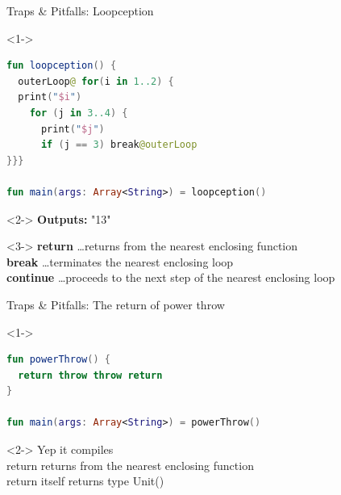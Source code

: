 \begin{frame}[fragile]{Traps \& Pitfalls: Loopception}
	\begin{overlayarea}{\textwidth}{\textheight}
		\begin{onlyenv}<1->
\begin{lstlisting}[language=Kotlin,basicstyle=\ttfamily\small]
fun loopception() {
  outerLoop@ for(i in 1..2) {
  print("$i")
    for (j in 3..4) {
      print("$j")
      if (j == 3) break@outerLoop
}}}

fun main(args: Array<String>) = loopception()
\end{lstlisting}
		\end{onlyenv}
		\begin{onlyenv}<2->
			\textbf{Outputs:} "13"\\\vspace{\baselineskip}
		\end{onlyenv}
		\begin{onlyenv}<3->
			\textbf{return} \dots returns from the nearest enclosing function\\
			\textbf{break} \dots terminates the nearest enclosing loop\\
			\textbf{continue} \dots proceeds to the next step of the nearest enclosing loop
		\end{onlyenv}
	\end{overlayarea}
\end{frame}


\begin{frame}[fragile]{Traps \& Pitfalls: The return of power throw}
	\begin{overlayarea}{\textwidth}{.5\textheight}
		\begin{onlyenv}<1->
\begin{lstlisting}[language=Kotlin,basicstyle=\ttfamily\small]
fun powerThrow() {
  return throw throw return
}

fun main(args: Array<String>) = powerThrow()
\end{lstlisting}
		\end{onlyenv}
		\begin{onlyenv}<2->
			Yep it compiles\\
			return returns from the nearest enclosing function\\
			return itself returns type Unit()
		\end{onlyenv}
	\end{overlayarea}
\end{frame}

